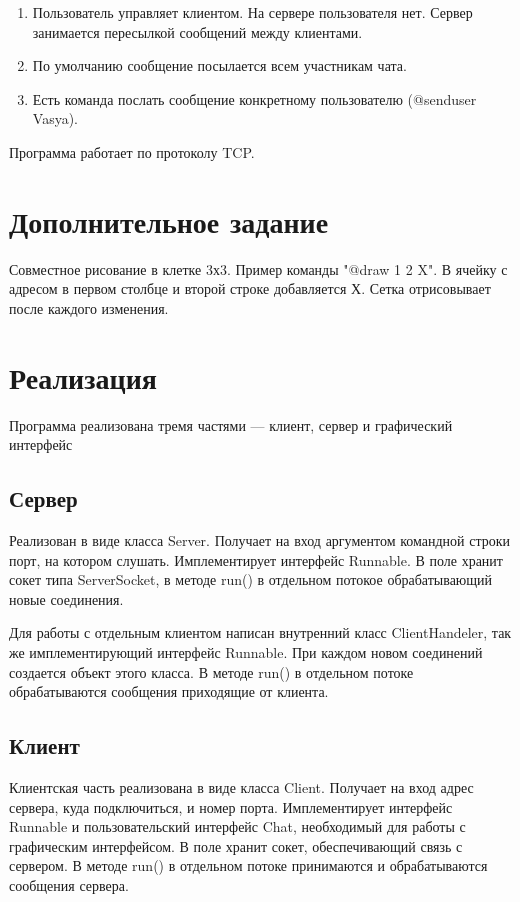 \documentclass{article}
\begin{document}
\begin{enumerate}
	\item Пользователь управляет клиентом. На сервере пользователя нет. Сервер занимается пересылкой сообщений между клиентами.
	\item По умолчанию сообщение посылается всем участникам чата.
	\item Есть команда послать сообщение конкретному пользователю (@senduser Vasya).
\end{enumerate}

Программа работает по протоколу TCP.

\section{Дополнительное задание}
Совместное рисование в клетке 3х3. Пример команды "@draw 1 2 X". В ячейку с адресом в первом столбце и второй строке добавляется Х. Сетка отрисовывает после каждого изменения.

\section{Реализация}
Программа реализована тремя частями --- клиент, сервер и графический интерфейс

\subsection{Сервер}
Реализован в виде класса Server. Получает на вход аргументом командной строки порт, на котором слушать. Имплементирует интерфейс Runnable. В поле хранит сокет типа ServerSocket, в методе run() в отдельном потокое обрабатывающий новые соединения.

Для работы с отдельным клиентом написан внутренний класс ClientHandeler, так же имплементирующий интерфейс Runnable. При каждом новом соединений создается объект этого класса. В методе run() в отдельном потоке обрабатываются сообщения приходящие от клиента.

\subsection{Клиент}
Клиентская часть реализована в виде класса Client. Получает на вход адрес сервера, куда подключиться, и номер порта. Имплементирует интерфейс Runnable и пользовательский интерфейс Chat, необходимый для работы с графическим интерфейсом. В поле хранит сокет, обеспечивающий связь с сервером. В методе run() в отдельном потоке принимаются и обрабатываются сообщения сервера. 
\end{document}
